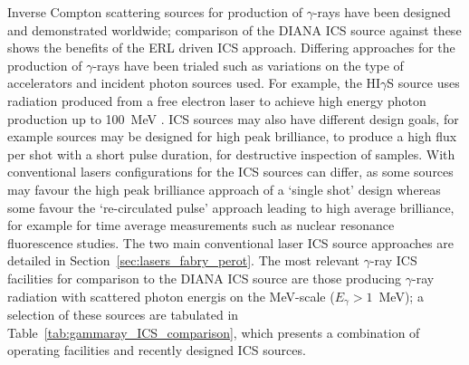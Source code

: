 \documentclass[../main.tex]{subfiles}
\begin{document}
Inverse Compton scattering sources for production of $\gamma$-rays have been designed and demonstrated worldwide; comparison of the DIANA ICS source against these shows the benefits of the ERL driven ICS approach. Differing approaches for the production of $\gamma$-rays have been trialed such as variations on the type of accelerators and incident photon sources used. For example, the HI$\gamma$S source uses radiation produced from a free electron laser to achieve high energy photon production up to 100~\si{\mega\electronvolt} \cite{weller2009research}. ICS sources may also have different design goals, for example sources may be designed for high peak brilliance, to produce a high flux per shot with a short pulse duration, for destructive inspection of samples. With conventional lasers configurations for the ICS sources can differ, as some sources may favour the high peak brilliance approach of a `single shot' design whereas some favour the `re-circulated pulse' approach leading to high average brilliance, for example for time average measurements such as nuclear resonance fluorescence studies. The two main conventional laser ICS source approaches are detailed in Section~\ref{sec:lasers_fabry_perot}. The most relevant $\gamma$-ray ICS facilities for comparison to the DIANA ICS source are those producing $\gamma$-ray radiation with scattered photon energis on the \si{\mega\electronvolt}-scale ($E_{\gamma}>1$~\si{\mega\electronvolt}); a selection of these sources are tabulated in Table~\ref{tab:gammaray_ICS_comparison}, which presents a combination of operating facilities and recently designed ICS sources. 
\end{document}
